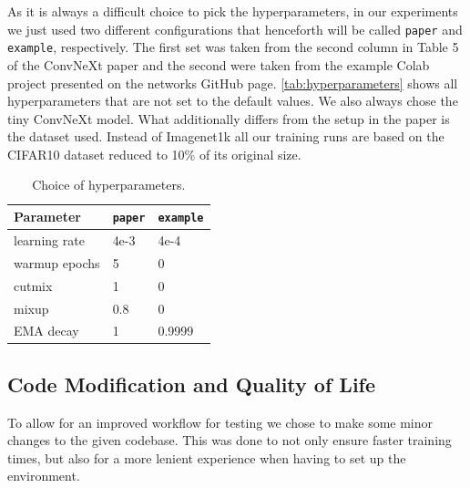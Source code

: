 \documentclass{article}
\begin{document}
As it is always a difficult choice to pick the hyperparameters, in our experiments we just used two different configurations that henceforth will be called \texttt{paper} and \texttt{example}, respectively.
The first set was taken from the second column in Table 5 of the ConvNeXt\cite{liu2022convnet} paper and the second were taken from the example Colab project presented on the networks GitHub page\cite{ayush0finetune}.
\autoref{tab:hyperparameters} shows all hyperparameters that are not set to the default values.
We also always chose the tiny ConvNeXt model.
What additionally differs from the setup in the paper is the dataset used.
Instead of Imagenet1k all our training runs are based on the CIFAR10\cite{krizhevsky2009learning} dataset reduced to 10\% of its original size.
\begin{table}[h]
    \caption{Choice of hyperparameters.}
    \begin{center}
        \begin{tabular}{lll}
            \hline
            Parameter     & \texttt{paper} & \texttt{example} \\ \hline
            learning rate & 4e-3           & 4e-4             \\
            warmup epochs & 5              & 0                \\
            cutmix        & 1              & 0                \\
            mixup         & 0.8            & 0                \\
            EMA decay     & 1              & 0.9999
        \end{tabular}
    \end{center}
    \label{tab:hyperparameters}
\end{table}

\subsection{Code Modification and Quality of Life}\label{subsec:code-modification}
To allow for an improved workflow for testing we chose to make some minor changes to the given codebase.
This was done to not only ensure faster training times, but also for a more lenient experience when having to set up the environment.
\end{document}
